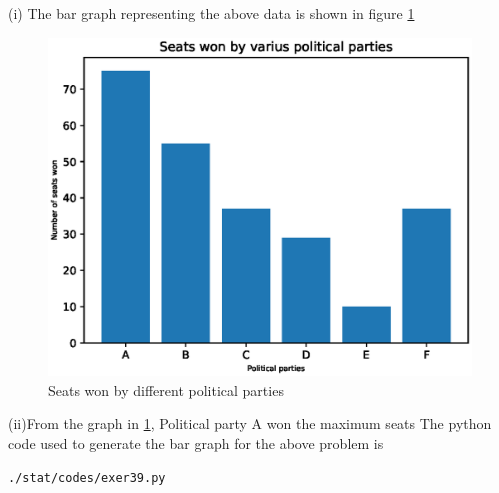 (i) The bar graph representing the above data is shown in figure \ref{fig:bar39_py}\\
\begin{figure}[!ht]
\centering
\includegraphics[width=\columnwidth]{./stat/codes/pyfigs/exer39.eps}
\caption{Seats won by different political parties}
\label{fig:bar39_py}
\end{figure}
(ii)From the graph in \ref{fig:bar39_py}, Political party A won the maximum seats
The python code used to generate the bar graph for the above problem is
\begin{lstlisting}
./stat/codes/exer39.py
\end{lstlisting}
